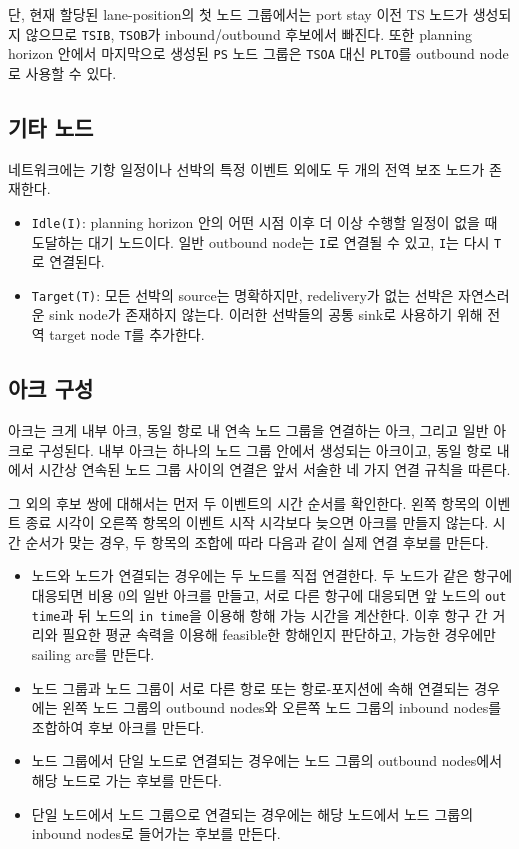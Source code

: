 \documentclass[11pt]{article}
\begin{document}
단, 현재 할당된 lane-position의 첫 노드 그룹에서는 port stay 이전 TS 노드가
생성되지 않으므로 \texttt{TSIB}, \texttt{TSOB}가 inbound/outbound 후보에서
빠진다. 또한 planning horizon 안에서 마지막으로 생성된 \texttt{PS} 노드 그룹은
\texttt{TSOA} 대신 \texttt{PLTO}를 outbound node로 사용할 수 있다.

\subsection{기타 노드}

네트워크에는 기항 일정이나 선박의 특정 이벤트 외에도 두 개의 전역 보조 노드가
존재한다.

\begin{itemize}[leftmargin=*]
  \item \texttt{Idle(I)}: planning horizon 안의 어떤 시점 이후 더 이상 수행할
  일정이 없을 때 도달하는 대기 노드이다. 일반 outbound node는 \texttt{I}로
  연결될 수 있고, \texttt{I}는 다시 \texttt{T}로 연결된다.
  \item \texttt{Target(T)}: 모든 선박의 source는 명확하지만, redelivery가 없는
  선박은 자연스러운 sink node가 존재하지 않는다. 이러한 선박들의 공통 sink로
  사용하기 위해 전역 target node \texttt{T}를 추가한다.
\end{itemize}

\subsection{아크 구성}

아크는 크게 내부 아크, 동일 항로 내 연속 노드 그룹을 연결하는 아크, 그리고 일반 아크로 구성된다. 
내부 아크는 하나의 노드 그룹 안에서 생성되는 아크이고,
동일 항로 내에서 시간상 연속된 노드 그룹 사이의 연결은 앞서 서술한 네 가지
연결 규칙을 따른다.

그 외의 후보 쌍에 대해서는 먼저 두 이벤트의 시간 순서를 확인한다. 왼쪽 항목의
이벤트 종료 시각이 오른쪽 항목의 이벤트 시작 시각보다 늦으면 아크를 만들지 않는다.
시간 순서가 맞는 경우, 두 항목의 조합에 따라 다음과 같이 실제 연결 후보를 만든다.

\begin{itemize}[leftmargin=*]
  \item 노드와 노드가 연결되는 경우에는 두 노드를 직접 연결한다.
  두 노드가 같은 항구에 대응되면 비용 0의 일반 아크를 만들고, 서로 다른 항구에
  대응되면 앞 노드의 \texttt{out time}과 뒤 노드의 \texttt{in time}을 이용해 항해
  가능 시간을 계산한다. 이후 항구 간 거리와 필요한 평균 속력을 이용해 feasible한
  항해인지 판단하고, 가능한 경우에만 sailing arc를 만든다.
  \item 노드 그룹과 노드 그룹이 서로 다른 항로 또는 항로-포지션에 속해 연결되는
  경우에는 왼쪽 노드 그룹의 outbound nodes와 오른쪽 노드 그룹의 inbound nodes를
  조합하여 후보 아크를 만든다.
  \item 노드 그룹에서 단일 노드로 연결되는 경우에는 노드 그룹의 outbound nodes에서
  해당 노드로 가는 후보를 만든다.
  \item 단일 노드에서 노드 그룹으로 연결되는 경우에는 해당 노드에서 노드 그룹의
  inbound nodes로 들어가는 후보를 만든다.
\end{itemize}
\end{document}
